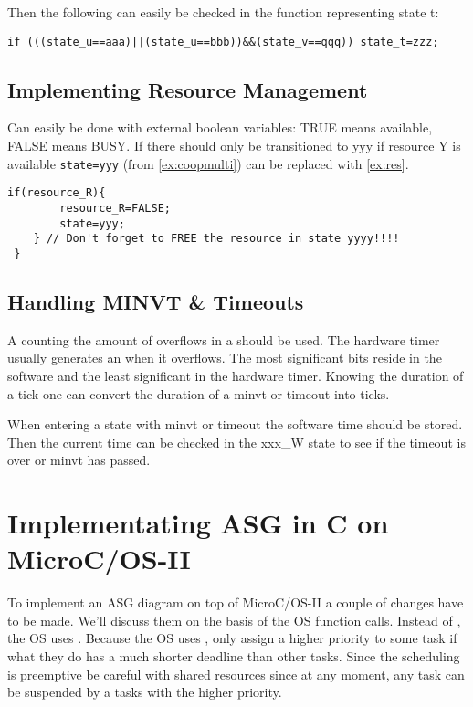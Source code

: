 \documentclass[../main.tex]{subfiles}
\begin{document}
Then the following can easily be checked in the function representing state t:
\begin{center}
\lstinline{if (((state_u==aaa)||(state_u==bbb))&&(state_v==qqq)) state_t=zzz;}
\end{center}

\subsection{Implementing Resource Management}
Can easily be done with external boolean variables: TRUE means available, FALSE means BUSY.
If there should only be transitioned to yyy if resource Y is available \lstinline{state=yyy} (from \ref{ex:coopmulti}) can be replaced with \ref{ex:res}.

\begin{lstlisting}[caption=Example of implementing resource management., label=ex:res]
	if(resource_R){
		resource_R=FALSE;
		state=yyy;
	} // Don't forget to FREE the resource in state yyyy!!!!
 }
\end{lstlisting}
\subsection{Handling MINVT \& Timeouts}
A  counting the amount of overflows in a  should be used.
The hardware timer usually generates an  when it overflows.
The most significant bits reside in the software and the least significant in the hardware timer.
Knowing the duration of a tick one can convert the duration of a minvt or timeout into ticks.

When entering a state with minvt or timeout the software time should be stored.
Then the current time can be checked in the xxx\_W state to see if the timeout is over or minvt has passed.


\section{Implementating ASG in C on MicroC/OS-II}

To implement an ASG diagram on top of MicroC/OS-II a couple of changes have to be made.
We'll discuss them on the basis of the OS function calls.
Instead of , the OS uses .
Because the OS uses , only assign a higher priority to some task if what they do has a much shorter deadline than other tasks.
Since the scheduling is preemptive be careful with shared resources since at any moment, any task can be suspended by a tasks with the higher priority.
\end{document}

